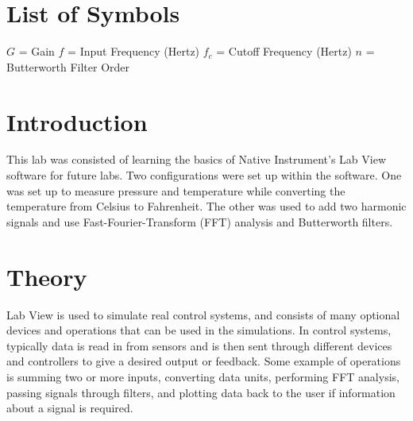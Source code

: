 \documentclass[12pt]{article}
\begin{document}

\tableofcontents

\listoffigures

\bigskip


\section*{\fontsize{12}{12}\selectfont \large List of Symbols}
$G$ = Gain
$f$ = Input Frequency (Hertz)
$f_{c}$ = Cutoff Frequency (Hertz)
$n$ = Butterworth Filter Order



\newpage



\section*{\fontsize{12}{12}\selectfont \large Introduction}
This lab was consisted of learning the  basics of Native Instrument's Lab View software for future labs. Two configurations were set up within the software. One was set up to measure pressure and temperature while converting the temperature from Celsius to Fahrenheit. The other was used to add two harmonic signals and use Fast-Fourier-Transform (FFT) analysis and Butterworth filters.


\section*{\fontsize{12}{12}\selectfont \large Theory}
Lab View is used to simulate real control systems, and consists of many optional devices and operations that can be used in the simulations. In control systems, typically data is read in from sensors and is then sent through different devices and controllers to give a desired output or feedback. Some example of operations is summing two or more inputs, converting data units, performing FFT analysis, passing signals through filters, and plotting data back to the user if information about a signal is required.
\bigskip
\end{document}
